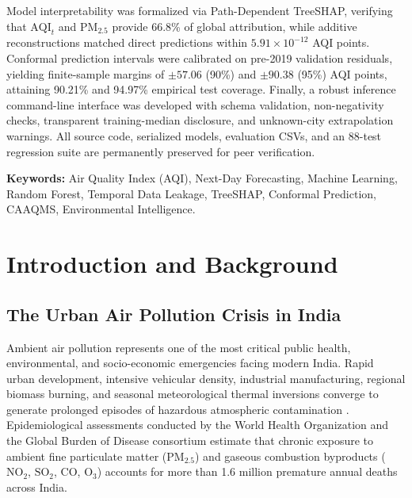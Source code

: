 \documentclass[11pt,a4paper]{report}
\begin{document}
Model interpretability was formalized via Path-Dependent TreeSHAP, verifying that $\text{AQI}_t$ and $\text{PM}_{2.5}$ provide 66.8\% of global attribution, while additive reconstructions matched direct predictions within $5.91 \times 10^{-12}$ AQI points. Conformal prediction intervals were calibrated on pre-2019 validation residuals, yielding finite-sample margins of $\pm 57.06$ (90\%) and $\pm 90.38$ (95\%) AQI points, attaining 90.21\% and 94.97\% empirical test coverage. Finally, a robust inference command-line interface was developed with schema validation, non-negativity checks, transparent training-median disclosure, and unknown-city extrapolation warnings. All source code, serialized models, evaluation CSVs, and an 88-test regression suite are permanently preserved for peer verification.

\vspace{0.8cm}
\noindent \textbf{Keywords:} Air Quality Index (AQI), Next-Day Forecasting, Machine Learning, Random Forest, Temporal Data Leakage, TreeSHAP, Conformal Prediction, CAAQMS, Environmental Intelligence.

\clearpage

\tableofcontents
\clearpage

\listoffigures
\clearpage

\listoftables
\clearpage


\chapter{Introduction and Background}

\section{The Urban Air Pollution Crisis in India}
Ambient air pollution represents one of the most critical public health, environmental, and socio-economic emergencies facing modern India. Rapid urban development, intensive vehicular density, industrial manufacturing, regional biomass burning, and seasonal meteorological thermal inversions converge to generate prolonged episodes of hazardous atmospheric contamination \cite{who2021air}. Epidemiological assessments conducted by the World Health Organization and the Global Burden of Disease consortium estimate that chronic exposure to ambient fine particulate matter ($\text{PM}_{2.5}$) and gaseous combustion byproducts ($\text{NO}_2$, $\text{SO}_2$, $\text{CO}$, $\text{O}_3$) accounts for more than 1.6 million premature annual deaths across India.
\end{document}
